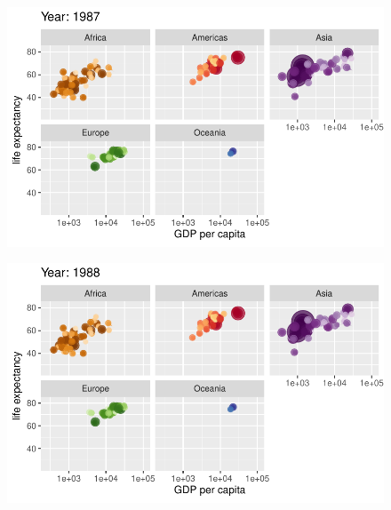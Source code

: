 \documentclass[
  letterpaper,
  DIV=11,
  numbers=noendperiod]{scrartcl}
\begin{document}
\begin{figure}[H]

{\centering \includegraphics{class05_files/figure-pdf/unnamed-chunk-24-64.pdf}

}

\end{figure}

\begin{figure}[H]

{\centering \includegraphics{class05_files/figure-pdf/unnamed-chunk-24-65.pdf}

}

\end{figure}
\end{document}
